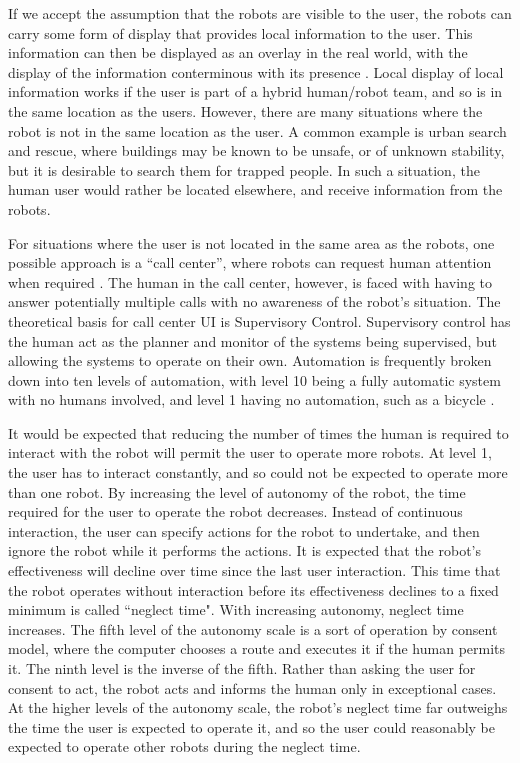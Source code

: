 If we accept the assumption that the robots are visible to the user, the robots can carry some form of display that provides local information to the user. 
This information can then be displayed as an overlay in the real world, with the display of the information conterminous with its presence \cite{Daily:2003:WEI:820752.821587}. 
Local display of local information works if the user is part of a hybrid human/robot team, and so is in the same location as the users. 
However, there are many situations where the robot is not in the same location as the user. 
A common example is urban search and rescue, where buildings may be known to be unsafe, or of unknown stability, but it is desirable to search them for trapped people. 
In such a situation, the human user would rather be located elsewhere, and receive information from the robots. 

For situations where the user is not located in the same area as the robots, one possible approach is a ``call center'', where robots can request human attention when required \cite{chen2011supervisory}. 
The human in the call center, however, is faced with having to answer potentially multiple calls with no awareness of the robot's situation. 
The theoretical basis for call center UI is Supervisory Control. 
Supervisory control has the human act as the planner and monitor of the systems being supervised, but allowing the systems to operate on their own.
Automation is frequently broken down into ten levels of automation, with level 10 being a fully automatic system with no humans involved, and level 1 having no automation, such as a bicycle \cite{parasuraman2000model}. 

It would be expected that reducing the number of times the human is required to interact with the robot will permit the user to operate more robots.
At level 1, the user has to interact constantly, and so could not be expected to operate more than one robot. 
By increasing the level of autonomy of the robot, the time required for the user to operate the robot decreases.
Instead of continuous interaction, the user can specify actions for the robot to undertake, and then ignore the robot while it performs the actions.
It is expected that the robot's effectiveness will decline over time since the last user interaction. 
This time that the robot operates without interaction before its effectiveness declines to a fixed minimum is called ``neglect time"\cite{olsen2003metrics}.
With increasing autonomy, neglect time increases.
The fifth level of the autonomy scale is a sort of operation by consent model, where the computer chooses a route and executes it if the human permits it. 
The ninth level is the inverse of the fifth.
Rather than asking the user for consent to act, the robot acts and informs the human only in exceptional cases. 
At the higher levels of the autonomy scale, the robot's neglect time far outweighs the time the user is expected to operate it, and so the user could reasonably be expected to operate other robots during the neglect time. 


